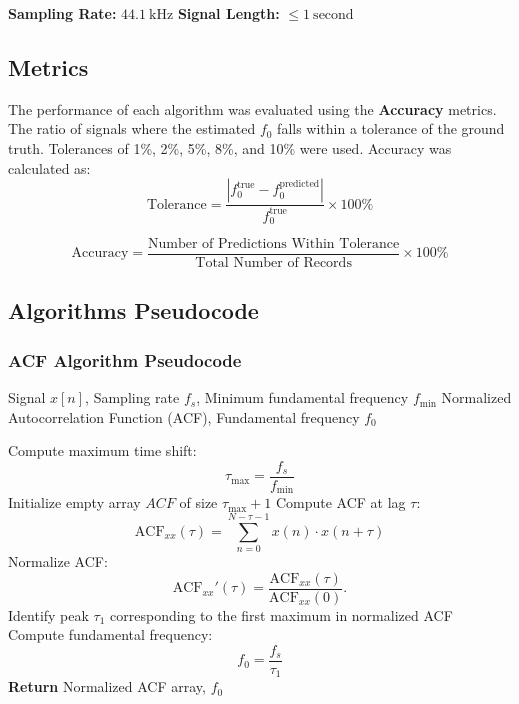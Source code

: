 \documentclass{ieeeaccess}
\begin{document}
\textbf{Sampling Rate:} \( 44.1\ \text{kHz} \)  
\textbf{Signal Length:} \( \leq 1\ \text{second} \)

\subsection{Metrics}

The performance of each algorithm was evaluated using the \textbf{Accuracy} metrics.
The ratio of signals where the estimated \(f_0\) falls within a tolerance of the ground truth. Tolerances of 1\%, 2\%, 5\%, 8\%, and 10\% were used. Accuracy was calculated as:
\begin{equation}
\text{Tolerance} = \frac{\left| f_0^{\text{true}} - f_0^{\text{predicted}} \right|}{f_0^{\text{true}}} \times 100\%
\label{eq:tolerance}
\end{equation}

\begin{equation}
\text{Accuracy} = \frac{\text{Number of Predictions Within Tolerance}}{\text{Total Number of Records}} \times 100\%
\label{eq:accuracy}
\end{equation}
\subsection{Algorithms Pseudocode}

\subsubsection{ACF Algorithm Pseudocode}
\begin{algorithmic}[1]
\vspace{5pt} \hline \vspace{5pt}
\REQUIRE Signal $x[n]$, Sampling rate $f_s$, Minimum fundamental frequency $f_{\text{min}}$
\vspace{5pt} \hline \vspace{5pt}
\ENSURE Normalized Autocorrelation Function (ACF), Fundamental frequency $f_0$

\STATE Compute maximum time shift:
    \[
    \tau_{\text{max}} = \frac{f_s}{f_{\text{min}}}
    \]
\STATE Initialize empty array $ACF$ of size $\tau_{\text{max}} + 1$
    \STATE Compute ACF at lag $\tau$: 
           \[
           \text{ACF}_{xx}(\tau) = \sum_{n=0}^{N-\tau-1} x(n) \cdot x(n+\tau)
           \]
\ENDFOR
\STATE Normalize ACF:
           \[
           \text{ACF}_{xx}'(\tau) = \frac{\text{ACF}_{xx}(\tau)}{\text{ACF}_{xx}(0)}.
           \]
\STATE Identify peak $\tau_1$ corresponding to the first maximum in normalized ACF
\STATE Compute fundamental frequency:
           \[
           f_0 = \frac{f_s}{\tau_1}
           \]
\STATE \textbf{Return} Normalized ACF array, $f_0$
\vspace{5pt} \hline \vspace{5pt}
\end{algorithmic}
\end{document}
